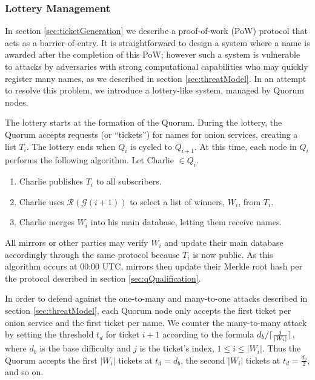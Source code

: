 \documentclass[USenglish,oneside,twocolumn]{article}
\DeclarePairedDelimiter{\ceil}{\lceil}{\rceil}
\newcommand*\nWinners{\left\vert{W_{i}}\right\vert}
\begin{document}
\subsubsection{Lottery Management}
\label{sec:lotteryManagement}

In section \ref{sec:ticketGeneration} we describe a proof-of-work (PoW) protocol that acts as a barrier-of-entry. It is straightforward to design a system where a name is awarded after the completion of this PoW; however such a system is vulnerable to attacks by adversaries with strong computational capabilities who may quickly register many names, as we described in section \ref{sec:threatModel}. In an attempt to resolve this problem, we introduce a lottery-like system, managed by Quorum nodes.

The lottery starts at the formation of the Quorum. During the lottery, the Quorum accepts requests (or ``tickets'') for names for onion services, creating a list $ T_{i} $. The lottery ends when $ Q_{i} $ is cycled to $ Q_{i + 1} $. At this time, each node in $ Q_{i} $ performs the following algorithm. Let Charlie $ \in Q_{i} $.

\begin{enumerate}
	\item Charlie publishes $ T_{i} $ to all subscribers.
	\item Charlie uses $ \mathcal{R}(\mathcal{G}(i + 1)) $ to select a list of winners, $ W_{i} $, from $ T_{i} $. 
	\item Charlie merges $ W_{i} $ into his main database, letting them receive names.
\end{enumerate}

All mirrors or other parties may verify $ W_{i} $ and update their main database accordingly through the same protocol because $ T_{i} $ is now public. As this algorithm occurs at 00:00 UTC, mirrors then update their Merkle root hash per the protocol described in section \ref{sec:qQualification}.

In order to defend against the one-to-many and many-to-one attacks described in section \ref{sec:threatModel}, each Quorum node only accepts the first ticket per onion service and the first ticket per name. We counter the many-to-many attack by setting the threshold $ t_{d} $ for ticket $ i + 1 $ according to the formula $ d_{b} / \ceil{\frac{j}{\nWinners}} $, where $ d_{b} $ is the base difficulty and $ j $ is the ticket's index, $ 1 \leq i \leq \nWinners $. Thus the Quorum accepts the first $ \nWinners $ tickets at $ t_{d} = d_{b} $, the second $ \nWinners $ tickets at $ t_{d} = \frac{d_{b}}{2} $, and so on.
\end{document}
